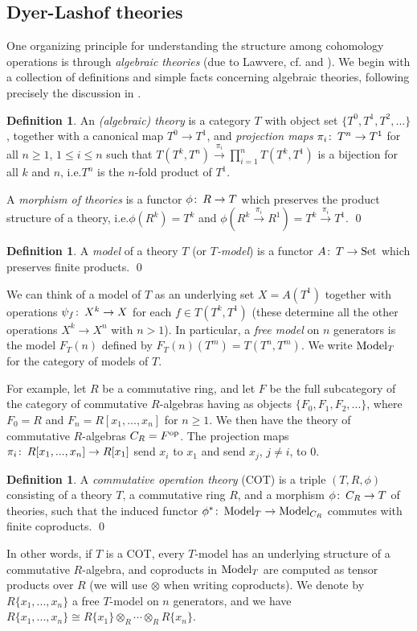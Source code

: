 \documentclass{gtpart}
\theoremstyle{definition}
\newtheorem{defn}[thm]{Definition}
\theoremstyle{remark}
\def\co{\colon\thinspace}
\newcommand{\Model}{{\rm Model}}
\newcommand{\cf}[1]{cf.\thinspace{\cite{#1}}}
\begin{document}
\subsection{Dyer-Lashof theories}

One organizing principle for understanding the structure among cohomology 
operations is through {\em algebraic theories} (due to Lawvere, \cf{lawvere} 
and \cite[chapter 3]{borceux}).  We begin with a collection of definitions and 
simple facts concerning algebraic theories, following precisely the discussion 
in \cite[sections 5--9]{lpo}.  

\begin{defn}
 An {\em (algebraic) theory} is a category $T$ with object set 
 $\{T^0,T^1,T^2,...\}$, together with a canonical map $T^0 \to T^1$, and {\em 
 projection maps} $\pi_i\co T^n \to T^1$ for all $n \ge 1$, $1 \le i \le n$ 
 such that $T(T^k,T^n) \xrightarrow{\pi_i} \prod_{i=1}^n T(T^k,T^1)$ is a 
 bijection for all $k$ and $n$, i.e.\thinspace$T^n$ is the $n$-fold product of 
 $T^1$.  
 
 A {\em morphism of theories} is a functor $\phi\co R \to T$ which preserves 
 the product structure of a theory, i.e.\thinspace$\phi(R^k) = T^k$ and 
 $\phi(R^k \stackrel{\pi_i}{\longrightarrow} R^1) = T^k 
 \stackrel{\pi_i}{\longrightarrow} T^1$.  \qed
\end{defn}
\begin{defn}
 A {\em model} of a theory $T$ (or {\em $T$-model}) is a functor 
 $A\co T \to {\rm Set}$ which preserves finite products.  \qed
\end{defn}
We can think of a model of $T$ as an underlying set $X = A(T^1)$ together with 
operations $\psi_f\co X^k \to X$ for each $f \in T(T^k,T^1)$ (these determine 
all the other operations $X^k \to X^n$ with $n>1$).  In particular, a {\em 
free model} on $n$ generators is the model $F_T(n)$ defined by $F_T(n)(T^m) = 
T(T^n,T^m)$.  We write $\Model_T$ for the category of models of $T$.  

For example, let $R$ be a commutative ring, and let $F$ be the full 
subcategory of the category of commutative $R$-algebras having as objects 
$\{F_0,F_1,F_2,...\}$, where $F_0 = R$ and $F_n = R[x_1,...,x_n]$ for $n \ge 
1$.  We then have the theory of commutative $R$-algebras $C_R = F^{\rm op}$.  
The projection maps $\pi_i\co R[x_1,...,x_n] \to R[x_1]$ send $x_i$ to $x_1$ 
and send $x_j$, $j \neq i$, to 0.  

\begin{defn}
 A {\em commutative operation theory} (COT) is a triple $(T,R,\phi)$ 
 consisting of a theory $T$, a commutative ring $R$, and a morphism 
 $\phi\co C_R \to T$ of theories, such that the induced functor 
 $\phi^*\co \Model_T \to \Model_{C_R}$ commutes with finite coproducts.  \qed
\end{defn}
In other words, if $T$ is a COT, every $T$-model has an underlying structure 
of a commutative $R$-algebra, and coproducts in $\Model_T$ are computed as 
tensor products over $R$ (we will use $\otimes$ when writing coproducts).  We 
denote by $R\{x_1,...,x_n\}$ a free $T$-model on $n$ generators, and we have 
$R\{x_1,...,x_n\} \cong R\{x_1\} \otimes_R \cdots \otimes_R R\{x_n\}$.  
\end{document}
